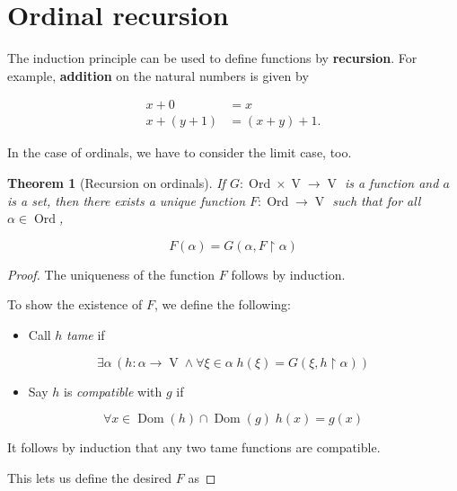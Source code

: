 \documentclass{article}
\newcommand{\Ord}{\operatorname{Ord}}
\newcommand{\V}{\Op{V}}
\newcommand{\Rest}[1]{\upharpoonright{#1}}
\newcommand{\Op}[1]{\operatorname{#1}}
\newtheorem{theorem}{Theorem}[section]
\begin{document}
\section{Ordinal recursion}

The induction principle can be used to define functions by \textbf{recursion}. For example, \textbf{addition} on the natural numbers is given by

\begin{align*}
    x+0 \quad & =  x\\
    x+ (y+1) & =  (x + y)+1. 
\end{align*}

In the case of ordinals, we have to consider the limit case, too.

\begin{theorem}[Recursion on ordinals]\label{thm-ordinal-recursion}If $G :\Ord \times \V \longrightarrow  \V$ is a function and $a$ is a set, then there exists a unique function $F: \Ord \longrightarrow \V$  such that for all $\alpha \in \Ord$,

\begin{equation}
F(\alpha) = G(\alpha, F\Rest{\alpha})
\end{equation}

\end{theorem}\begin{proof}The uniqueness of the function $F$ follows by induction.

To show the existence of $F$, we define the following:

\begin{itemize}
\item Call $h$ \textit{tame} if
\end{itemize}
\begin{equation*}
\exists \alpha \, (h: \alpha \to \V  \wedge \forall \xi \in \alpha \; h(\xi) = G(\xi, h \Rest{\alpha}))
\end{equation*}

\begin{itemize}
\item Say $h$ is \textit{compatible} with $g$ if
\end{itemize}
\begin{equation*}
\forall x \in \Op{Dom}(h) \cap \Op{Dom}(g) \; h(x) = g(x)
\end{equation*}

It follows by induction that any two tame functions are compatible.

This lets us define the desired $F$ as


\end{proof}
\end{document}
